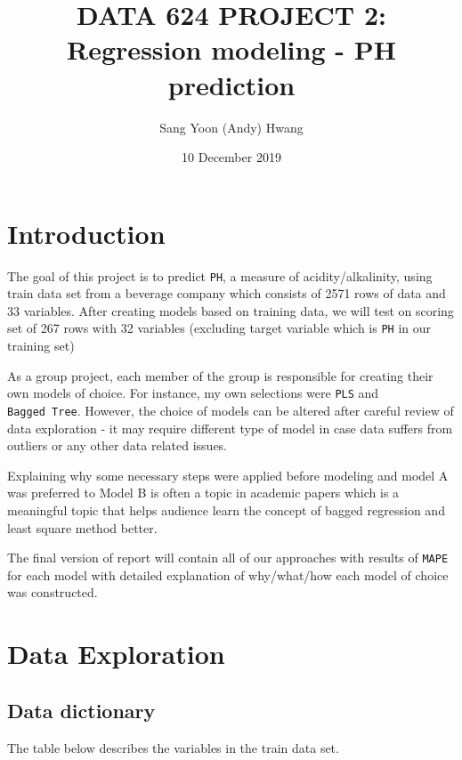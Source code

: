 \documentclass[]{report}
\title{DATA 624 PROJECT 2: Regression modeling - PH prediction}
\author{Sang Yoon (Andy) Hwang}
\date{10 December 2019}
\begin{document}
\maketitle

{
\setcounter{tocdepth}{1}
\tableofcontents
}
\thispagestyle{empty} \newpage
\clearpage
{}

\chapter*{Introduction}\label{intro}

The goal of this project is to predict \texttt{PH}, a measure of
acidity/alkalinity, using train data set from a beverage company which
consists of 2571 rows of data and 33 variables. After creating models
based on training data, we will test on scoring set of 267 rows with 32
variables (excluding target variable which is \texttt{PH} in our
training set)

As a group project, each member of the group is responsible for creating
their own models of choice. For instance, my own selections were
\texttt{PLS} and \texttt{Bagged\ Tree}. However, the choice of models
can be altered after careful review of data exploration - it may require
different type of model in case data suffers from outliers or any other
data related issues.

Explaining why some necessary steps were applied before modeling and
model A was preferred to Model B is often a topic in academic papers
which is a meaningful topic that helps audience learn the concept of
bagged regression and least square method better.

The final version of report will contain all of our approaches with
results of \texttt{MAPE} for each model with detailed explanation of
why/what/how each model of choice was constructed.

\chapter{Data Exploration}\label{data-exploration}

\section{Data dictionary}\label{data-dictionary}

The table below describes the variables in the train data set.
\end{document}
